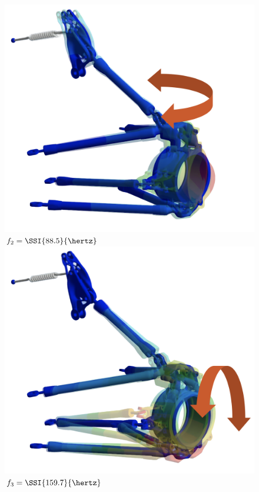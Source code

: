 \begin{figure}[!ht]
\begin{minipage}[c]{0.125\linewidth}
\begin{center}
      \includegraphics[width=1.0\linewidth]{./figures/chapter_7/mode2.png} \\ \small{$f_2 = \SSI{88.5}{\hertz}$} \\[0.8in]
      \includegraphics[width=1.0\linewidth]{./figures/chapter_7/mode3.png} \\ \small{$f_3 = \SSI{159.7}{\hertz}$} \\

\end{center}
\end{minipage}
\end{figure}
